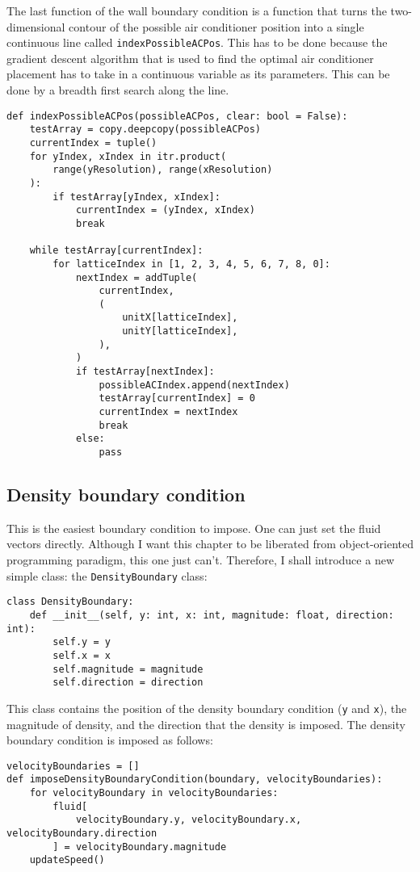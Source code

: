 The last function of the wall boundary condition is a function that turns the two-dimensional contour of the possible air conditioner position into a single continuous line called \texttt{indexPossibleACPos}. This has to be done because the gradient descent algorithm that is used to find the optimal air conditioner placement has to take in a continuous variable as its parameters. This can be done by a breadth first search along the line.
\begin{verbatim}
def indexPossibleACPos(possibleACPos, clear: bool = False):
    testArray = copy.deepcopy(possibleACPos)
    currentIndex = tuple()
    for yIndex, xIndex in itr.product(
        range(yResolution), range(xResolution)
    ):
        if testArray[yIndex, xIndex]:
            currentIndex = (yIndex, xIndex)
            break

    while testArray[currentIndex]:
        for latticeIndex in [1, 2, 3, 4, 5, 6, 7, 8, 0]:
            nextIndex = addTuple(
                currentIndex,
                (
                    unitX[latticeIndex],
                    unitY[latticeIndex],
                ),
            )
            if testArray[nextIndex]:
                possibleACIndex.append(nextIndex)
                testArray[currentIndex] = 0
                currentIndex = nextIndex
                break
            else:
                pass
\end{verbatim}

\subsection{Density boundary condition} This is the easiest boundary condition to impose. One can just set the fluid vectors directly. Although I want this chapter to be liberated from object-oriented programming paradigm, this one just can't. Therefore, I shall introduce a new simple class: the \texttt{DensityBoundary} class:
\begin{verbatim}
class DensityBoundary:
    def __init__(self, y: int, x: int, magnitude: float, direction: int):
        self.y = y
        self.x = x
        self.magnitude = magnitude
        self.direction = direction
\end{verbatim}
This class contains the position of the density boundary condition (\texttt{y} and \texttt{x}), the magnitude of density, and the direction that the density is imposed. The density boundary condition is imposed as follows:
\begin{verbatim}
velocityBoundaries = []
def imposeDensityBoundaryCondition(boundary, velocityBoundaries):
    for velocityBoundary in velocityBoundaries:
        fluid[
            velocityBoundary.y, velocityBoundary.x, velocityBoundary.direction
        ] = velocityBoundary.magnitude
    updateSpeed()
\end{verbatim}


